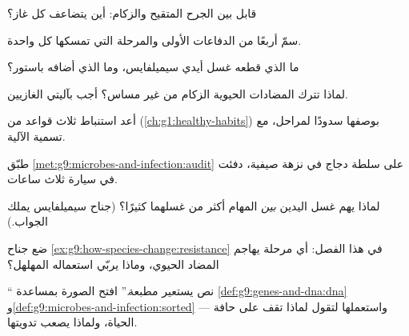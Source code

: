\begin{exercise}[$\star$]\label{exo:g9:microbes-and-infection:4}
قابل بين الجرح المتقيح والزكام: أين يتضاعف كل غاز؟
\end{exercise}

\begin{exercise}[$\star$]\label{exo:g9:microbes-and-infection:5}
سمّ أربعًا من الدفاعات الأولى والمرحلة التي تمسكها كل واحدة.
\end{exercise}

\begin{exercise}[$\star$]\label{exo:g9:microbes-and-infection:6}
ما الذي قطعه غسل أيدي سيميلفايس، وما الذي أضافه باستور؟
\end{exercise}

\begin{exercise}[$\star\star$]\label{exo:g9:microbes-and-infection:7}
لماذا تترك المضادات الحيوية الزكام من غير مساس؟ أجب
بآليتي الغازيين.
\end{exercise}

\begin{exercise}[$\star\star$]\label{exo:g9:microbes-and-infection:8}
أعد استنباط ثلاث قواعد  من 
(\cref{ch:g1:healthy-habits}) بوصفها سدودًا لمراحل، مع
تسمية الآلية.
\end{exercise}

\begin{exercise}[$\star\star$]\label{exo:g9:microbes-and-infection:9}
طبّق \cref{met:g9:microbes-and-infection:audit} على سلطة
دجاج في نزهة صيفية، دفئت في سيارة ثلاث ساعات.
\end{exercise}

\begin{exercise}[$\star\star$]\label{exo:g9:microbes-and-infection:10}
لماذا يهم غسل اليدين \emph{بين} المهام أكثر من غسلهما
كثيرًا؟ (جناح سيميلفايس يملك الجواب.)
\end{exercise}

\begin{exercise}[$\star\star$]\label{exo:g9:microbes-and-infection:11}
ضع جناح \cref{ex:g9:how-species-change:resistance} في
هذا الفصل: أي مرحلة يهاجم المضاد الحيوي، وماذا يربّي
استعماله المهلهل؟
\end{exercise}

\begin{exercise}[$\star\star\star$]\label{exo:g9:microbes-and-infection:12}
`` نص يستعير مطبعة.'' افتح الصورة بمساعدة
\cref{def:g9:genes-and-dna:dna}
و\cref{def:g9:microbes-and-infection:sorted} ---
واستعملها لتقول لماذا تقف  على حافة الحياة،
ولماذا يصعب تدويتها.
\end{exercise}

